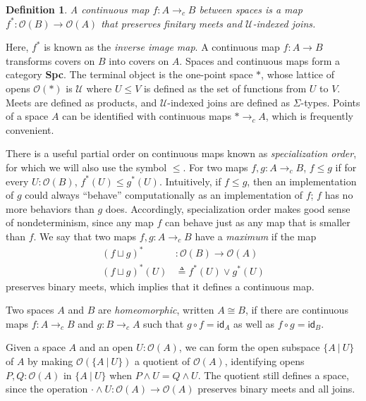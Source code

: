 \documentclass[conference]{IEEEtran}
\newtheorem{definition}{Definition}
\newcommand{\cto}{\to_c}
\newcommand{\Type}{\mathcal{U}}
\newcommand{\suchthat}{\ |\ }
\newcommand{\One}{\ast}
\newcommand{\Open}[1]{\mathcal{O}({#1})}
\newcommand{\iimg}[1]{#1^*}
\begin{document}
\begin{definition}
A \emph{continuous map} $f : A \cto B$ between spaces is a map $\iimg{f} : \Open{B} \to \Open{A}$ that preserves finitary meets and $\Type$-indexed joins.
\end{definition}

Here, $\iimg{f}$ is known as the \emph{inverse image map}. A continuous map $f : A \to B$ transforms covers on $B$ into covers on $A$. Spaces and continuous maps form a category \textbf{Spc}. The terminal object is the one-point space $\One$, whose lattice of opens $\Open{\One}$ is $\Type$ where $U \le V$ is defined as the set of functions from $U$ to $V$. Meets are defined as products, and $\Type$-indexed joins are defined as $\Sigma$-types. Points of a space $A$ can be identified with continuous maps $\One \cto A$, which is frequently convenient.

There is a useful partial order on continuous maps known as \emph{specialization order}, for which we will also use the symbol $\le$. For two maps $f, g : A \cto B$, $f \le g$ if for every $U : \Open{B}$, $\iimg{f}(U) \le \iimg{g}(U)$. Intuitively, if $f \le g$, then an implementation of $g$ could always ``behave'' computationally as an implementation of $f$; $f$ has no more behaviors than $g$ does. Accordingly, specialization order makes good sense of nondeterminism, since any map $f$ can behave just as any map that is smaller than $f$. We say that two maps $f, g : A \cto B$ have a \emph{maximum} if the map
\begin{align*}
\iimg{(f \sqcup g)} &: \Open{B} \to \Open{A}
\\ \iimg{(f \sqcup g)}(U) &\triangleq \iimg{f}(U) \vee \iimg{g}(U)
\end{align*}
preserves binary meets, which implies that it defines a continuous map.

Two spaces $A$ and $B$ are \emph{homeomorphic}, written $A \cong B$, if there are continuous maps $f : A \cto B$ and $g : B \cto A$ such that $g \circ f = \mathsf{id}_A$ as well as $f \circ g = \mathsf{id}_B$.

Given a space $A$ and an open $U : \Open{A}$, we can form the open subspace $\{ A \suchthat U \}$ of $A$ by making $\Open{\{A \suchthat U \}}$ a quotient of $\Open{A}$, identifying opens $P, Q : \Open{A}$ in $\{ A \suchthat U \}$ when $P \wedge U = Q \wedge U$. The quotient still defines a space, since the operation $\cdot \wedge U : \Open{A} \to \Open{A}$ preserves binary meets and all joins.
\end{document}
